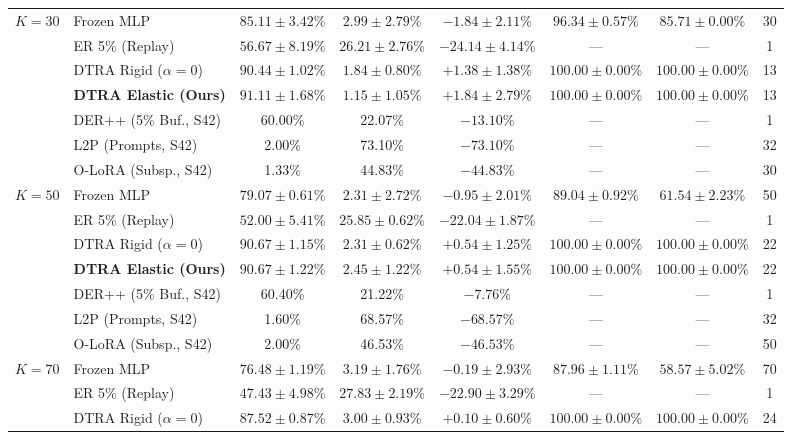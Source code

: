 \documentclass[10pt]{article}
\begin{document}
\begin{table}[ht!]
\begin{tabular}{llcccccc}
    $K=30$ & Frozen MLP & $85.11 \pm 3.42$\% & $2.99 \pm 2.79$\% & $-1.84 \pm 2.11$\% & $96.34 \pm 0.57$\% & $85.71 \pm 0.00$\% & 30 \\
     & ER 5\% (Replay) & $56.67 \pm 8.19$\% & $26.21 \pm 2.76$\% & $-24.14 \pm 4.14$\% & --- & --- & 1 \\
     & DTRA Rigid ($\alpha=0$) & $90.44 \pm 1.02$\% & $1.84 \pm 0.80$\% & $+1.38 \pm 1.38$\% & $\mathbf{100.00 \pm 0.00}$\% & $\mathbf{100.00 \pm 0.00}$\% & 13 \\
     & \textbf{DTRA Elastic (Ours)} & $\mathbf{91.11 \pm 1.68}$\% & $1.15 \pm 1.05$\% & $+1.84 \pm 2.79$\% & $\mathbf{100.00 \pm 0.00}$\% & $\mathbf{100.00 \pm 0.00}$\% & 13 \\
    & DER++ (5\% Buf., S42) & 60.00\% & 22.07\% & $-13.10$\% & --- & --- & 1 \\
    & L2P (Prompts, S42) & 2.00\% & 73.10\% & $-73.10$\% & --- & --- & 32 \\
    & O-LoRA (Subsp., S42) & 1.33\% & 44.83\% & $-44.83$\% & --- & --- & 30 \\
    \midrule
    $K=50$ & Frozen MLP & $79.07 \pm 0.61$\% & $2.31 \pm 2.72$\% & $-0.95 \pm 2.01$\% & $89.04 \pm 0.92$\% & $61.54 \pm 2.23$\% & 50 \\
     & ER 5\% (Replay) & $52.00 \pm 5.41$\% & $25.85 \pm 0.62$\% & $-22.04 \pm 1.87$\% & --- & --- & 1 \\
     & DTRA Rigid ($\alpha=0$) & $\mathbf{90.67 \pm 1.15}$\% & $2.31 \pm 0.62$\% & $+0.54 \pm 1.25$\% & $\mathbf{100.00 \pm 0.00}$\% & $\mathbf{100.00 \pm 0.00}$\% & 22 \\
     & \textbf{DTRA Elastic (Ours)} & $\mathbf{90.67 \pm 1.22}$\% & $2.45 \pm 1.22$\% & $+0.54 \pm 1.55$\% & $\mathbf{100.00 \pm 0.00}$\% & $\mathbf{100.00 \pm 0.00}$\% & 22 \\
    & DER++ (5\% Buf., S42) & 60.40\% & 21.22\% & $-7.76$\% & --- & --- & 1 \\
    & L2P (Prompts, S42) & 1.60\% & 68.57\% & $-68.57$\% & --- & --- & 32 \\
    & O-LoRA (Subsp., S42) & 2.00\% & 46.53\% & $-46.53$\% & --- & --- & 50 \\
    \midrule
    $K=70$ & Frozen MLP & $76.48 \pm 1.19$\% & $3.19 \pm 1.76$\% & $-0.19 \pm 2.93$\% & $87.96 \pm 1.11$\% & $58.57 \pm 5.02$\% & 70 \\
     & ER 5\% (Replay) & $47.43 \pm 4.98$\% & $27.83 \pm 2.19$\% & $-22.90 \pm 3.29$\% & --- & --- & 1 \\
     & DTRA Rigid ($\alpha=0$) & $87.52 \pm 0.87$\% & $3.00 \pm 0.93$\% & $+0.10 \pm 0.60$\% & $\mathbf{100.00 \pm 0.00}$\% & $\mathbf{100.00 \pm 0.00}$\% & 24 \\

\end{tabular}
\end{table}
\end{document}
